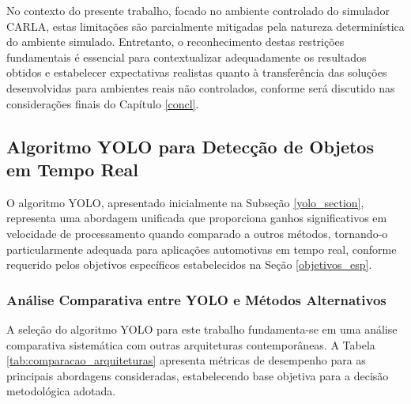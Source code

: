 No contexto do presente trabalho, focado no ambiente controlado do simulador CARLA, estas limitações são parcialmente mitigadas pela natureza determinística do ambiente simulado. Entretanto, o reconhecimento destas restrições fundamentais é essencial para contextualizar adequadamente os resultados obtidos e estabelecer expectativas realistas quanto à transferência das soluções desenvolvidas para ambientes reais não controlados, conforme será discutido nas considerações finais do Capítulo \ref{concl}.

\subsection{Algoritmo YOLO para Detecção de Objetos em Tempo Real} \label{YOLO_metodo}

O algoritmo YOLO, apresentado inicialmente na Subseção \ref{yolo_section}, representa uma abordagem unificada que proporciona ganhos significativos em velocidade de processamento quando comparado a outros métodos, tornando-o particularmente adequada para aplicações automotivas em tempo real, conforme requerido pelos objetivos específicos estabelecidos na Seção \ref{objetivos_esp}.

\subsubsection{Análise Comparativa entre YOLO e Métodos Alternativos} \label{subsubsec:comparacao_metodos}

A seleção do algoritmo YOLO para este trabalho fundamenta-se em uma análise comparativa sistemática com outras arquiteturas contemporâneas. A Tabela \ref{tab:comparacao_arquiteturas} apresenta métricas de desempenho para as principais abordagens consideradas, estabelecendo base objetiva para a decisão metodológica adotada.

